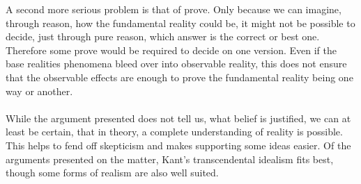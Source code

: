 \documentclass[fleqn,14pt]{article}
\begin{document}
A second more serious problem is that of prove. Only because we can imagine, through reason, 
how the fundamental reality could be, it might not be possible to decide, just through pure reason, which
answer is the correct or best one. Therefore some prove would be required to decide on one version.
Even if the base realities phenomena bleed over into observable reality, this does not ensure that the
observable effects are enough to prove the fundamental reality being one way or another. \\
\\

While the argument presented does not tell us, what belief is justified, we can at least be certain,
that in theory, a complete understanding of reality is possible. This helps to fend off skepticism and
makes supporting some ideas easier. Of the arguments presented on the matter, Kant's transcendental idealism
fits best, though some forms of realism are also well suited.


\printbibliography 
\end{document}
